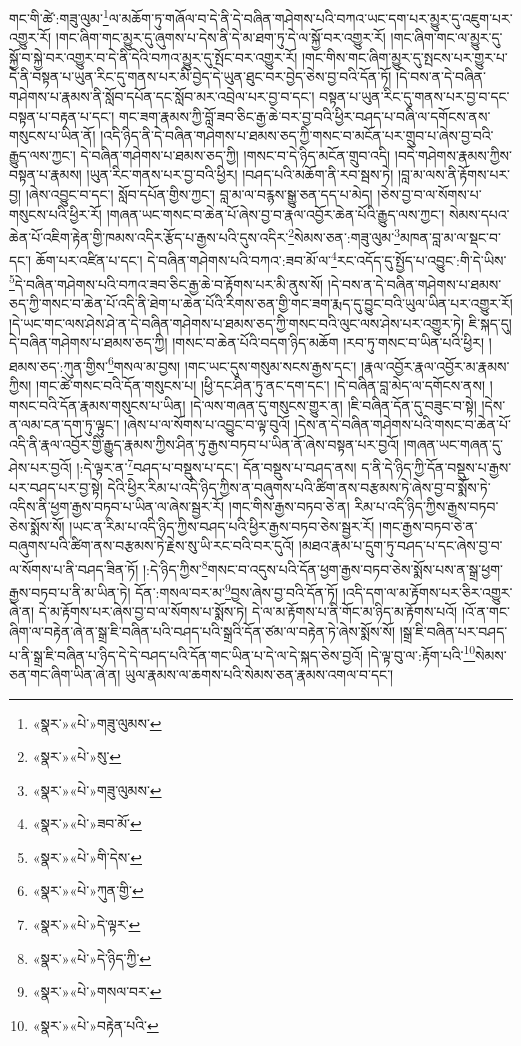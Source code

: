 གང་གི་ཚེ་:གཟུ་ལུམ་\footnote{«སྣར་»«པེ་»གཟུ་ལུམས་}ལ་མཆོག་ཏུ་གཞོལ་བ་དེ་ནི་དེ་བཞིན་གཤེགས་པའི་བཀའ་ཡང་དག་པར་མྱུར་དུ་འཇུག་པར་འགྱུར་རོ། །གང་ཞིག་གང་མྱུར་དུ་ཞུགས་པ་དེས་ནི་དེ་མ་ཐག་ཏུ་དེ་ལ་སྐྱོ་བར་འགྱུར་རོ། །གང་ཞིག་གང་ལ་མྱུར་དུ་སྐྱོ་བ་སྐྱེ་བར་འགྱུར་བ་དེ་ནི་དེའི་བཀའ་མྱུར་དུ་སྤོང་བར་འགྱུར་རོ། །གང་གིས་གང་ཞིག་མྱུར་དུ་སྤངས་པར་གྱུར་པ་དེ་ནི་བསྟན་པ་ཡུན་རིང་དུ་གནས་པར་མི་བྱེད་དེ་ཡུན་ཐུང་བར་བྱེད་ཅེས་བྱ་བའི་དོན་ཏོ། །དེ་བས་ན་དེ་བཞིན་གཤེགས་པ་རྣམས་ནི་སློབ་དཔོན་དང་སློབ་མར་འབྲེལ་པར་བྱ་བ་དང་། བསྟན་པ་ཡུན་རིང་དུ་གནས་པར་བྱ་བ་དང་བསྟན་པ་བརྟན་པ་དང་། གང་ཟག་རྣམས་ཀྱི་བློ་ཟབ་ཅིང་རྒྱ་ཆེ་བར་བྱ་བའི་ཕྱིར་བཤད་པ་བཞི་ལ་དགོངས་ནས་གསུངས་པ་ཡིན་ནོ། །འདི་ཉིད་ནི་དེ་བཞིན་གཤེགས་པ་ཐམས་ཅད་ཀྱི་གསང་བ་མངོན་པར་གྲུབ་པ་ཞེས་བྱ་བའི་རྒྱུད་ལས་ཀྱང་། དེ་བཞིན་གཤེགས་པ་ཐམས་ཅད་ཀྱི། །གསང་བ་དེ་ཉིད་མངོན་གྲུབ་འདི། །བདེ་གཤེགས་རྣམས་ཀྱིས་བསྟན་པ་རྣམས། །ཡུན་རིང་གནས་པར་བྱ་བའི་ཕྱིར། །བཤད་པའི་མཆོག་ནི་རབ་སྦས་ཏེ། །བླ་མ་ལས་ནི་རྟོགས་པར་བྱ། །ཞེས་འབྱུང་བ་དང་། སློབ་དཔོན་གྱིས་ཀྱང་། བླ་མ་ལ་བརྙས་སྒྱུ་ཅན་དད་པ་མེད། །ཅེས་བྱ་བ་ལ་སོགས་པ་གསུངས་པའི་ཕྱིར་རོ། །གཞན་ཡང་གསང་བ་ཆེན་པོ་ཞེས་བྱ་བ་རྣལ་འབྱོར་ཆེན་པོའི་རྒྱུད་ལས་ཀྱང་། སེམས་དཔའ་ཆེན་པོ་འཇིག་རྟེན་གྱི་ཁམས་འདིར་རྩོད་པ་རྒྱས་པའི་དུས་འདིར་\footnote{«སྣར་»«པེ་»སུ་}སེམས་ཅན་:གཟུ་ལུམ་\footnote{«སྣར་»«པེ་»གཟུ་ལུམས་}མཁན་བླ་མ་ལ་སྡང་བ་དང་། ཆོག་པར་འཛིན་པ་དང་། དེ་བཞིན་གཤེགས་པའི་བཀའ་:ཟབ་མོ་ལ་\footnote{«སྣར་»«པེ་»ཟབ་མོ་}རང་འདོད་དུ་སྤྱོད་པ་འབྱུང་:གི་དེ་ཡིས་\footnote{«སྣར་»«པེ་»གི་དེས་}དེ་བཞིན་གཤེགས་པའི་བཀའ་ཟབ་ཅིང་རྒྱ་ཆེ་བ་རྟོགས་པར་མི་ནུས་སོ། །དེ་བས་ན་དེ་བཞིན་གཤེགས་པ་ཐམས་ཅད་ཀྱི་གསང་བ་ཆེན་པོ་འདི་ནི་ཐེག་པ་ཆེན་པོའི་རིགས་ཅན་གྱི་གང་ཟག་རྨད་དུ་བྱུང་བའི་ཡུལ་ཡིན་པར་འགྱུར་རོ། །དེ་ཡང་གང་ལས་ཤེས་ཤེ་ན་དེ་བཞིན་གཤེགས་པ་ཐམས་ཅད་ཀྱི་གསང་བའི་ལུང་ལས་ཤེས་པར་འགྱུར་ཏེ། ཇི་སྐད་དུ། དེ་བཞིན་གཤེགས་པ་ཐམས་ཅད་ཀྱི། །གསང་བ་ཆེན་པོའི་བདག་ཉིད་མཆོག །རབ་ཏུ་གསང་བ་ཡིན་པའི་ཕྱིར། །ཐམས་ཅད་:ཀུན་གྱིས་\footnote{«སྣར་»«པེ་»ཀུན་གྱི་}གསལ་མ་བྱས། །གང་ཡང་དུས་གསུམ་སངས་རྒྱས་དང་། །རྣལ་འབྱོར་རྣལ་འབྱོར་མ་རྣམས་ཀྱིས། །གང་ཚེ་གསང་བའི་དོན་གསུངས་པ། །ཕྱི་དང་ཤིན་ཏུ་ནང་དག་དང་། །དེ་བཞིན་བླ་མེད་ལ་དགོངས་ནས། །གསང་བའི་དོན་རྣམས་གསུངས་པ་ཡིན། །དེ་ལས་གཞན་དུ་གསུངས་གྱུར་ན། །ཇི་བཞིན་དོན་དུ་བཟུང་བ་སྟེ། །དེས་ན་ལམ་ངན་དག་ཏུ་ལྟུང་། །ཞེས་པ་ལ་སོགས་པ་འབྱུང་བ་ལྟ་བུའོ། །དེས་ན་དེ་བཞིན་གཤེགས་པའི་གསང་བ་ཆེན་པོ་འདི་ནི་རྣལ་འབྱོར་གྱི་རྒྱུད་རྣམས་ཀྱིས་ཤིན་ཏུ་རྒྱས་བཏབ་པ་ཡིན་ནོ་ཞེས་བསྟན་པར་བྱའོ། །གཞན་ཡང་གཞན་དུ་ཤེས་པར་བྱའོ། །:དེ་ལྟར་ན་\footnote{«སྣར་»«པེ་»དེ་ལྟར་}བཤད་པ་བསྡུས་པ་དང་། དོན་བསྡུས་པ་བཤད་ནས། ད་ནི་དེ་ཉིད་ཀྱི་དོན་བསྡུས་པ་རྒྱས་པར་བཤད་པར་བྱ་སྟེ། དེའི་ཕྱིར་རིམ་པ་འདི་ཉིད་ཀྱིས་ན་བཞུགས་པའི་ཚིག་ནས་བརྩམས་ཏེ་ཞེས་བྱ་བ་སྨོས་ཏེ་འདིས་ནི་ཕྱག་རྒྱས་བཏབ་པ་ཡིན་ལ་ཞེས་སྦྱར་རོ། །གང་གིས་རྒྱས་བཏབ་ཅེ་ན། རིམ་པ་འདི་ཉིད་ཀྱིས་རྒྱས་བཏབ་ཅེས་སྨོས་སོ། །ཡང་ན་རིམ་པ་འདི་ཉིད་ཀྱིས་བཤད་པའི་ཕྱིར་རྒྱས་བཏབ་ཅེས་སྦྱར་རོ། །གང་རྒྱས་བཏབ་ཅེ་ན་བཞུགས་པའི་ཚིག་ནས་བརྩམས་ཏེ་རྗེས་སུ་ཡི་རང་བའི་བར་དུའོ། །མཐའ་རྣམ་པ་དྲུག་ཏུ་བཤད་པ་དང་ཞེས་བྱ་བ་ལ་སོགས་པ་ནི་བཤད་ཟིན་ཏོ། །:དེ་ཉིད་ཀྱིས་\footnote{«སྣར་»«པེ་»དེ་ཉིད་ཀྱི་}གསང་བ་འདུས་པའི་དོན་ཕྱག་རྒྱས་བཏབ་ཅེས་སྨོས་པས་ན་སྒྲ་ཕྱག་རྒྱས་བཏབ་པ་ནི་མ་ཡིན་ཏེ། དོན་:གསལ་བར་མ་\footnote{«སྣར་»«པེ་»གསལ་བར་}བྱས་ཞེས་བྱ་བའི་དོན་ཏོ། །འདི་དག་ལ་མ་རྟོགས་པར་ཅིར་འགྱུར་ཞེ་ན། དེ་མ་རྟོགས་པར་ཞེས་བྱ་བ་ལ་སོགས་པ་སྨོས་ཏེ། དེ་ལ་མ་རྟོགས་པ་ནི་གོང་མ་ཉིད་མ་རྟོགས་པའོ། །འོ་ན་གང་ཞིག་ལ་བརྟེན་ཞེ་ན་སྒྲ་ཇི་བཞིན་པའི་བཤད་པའི་སྒྲའི་དོན་ཙམ་ལ་བརྟེན་ཏེ་ཞེས་སྨོས་སོ། །སྒྲ་ཇི་བཞིན་པར་བཤད་པ་ནི་སྒྲ་ཇི་བཞིན་པ་ཉིད་དེ་དེ་བཤད་པའི་དོན་གང་ཡིན་པ་དེ་ལ་དེ་སྐད་ཅེས་བྱའོ། །དེ་ལྟ་བུ་ལ་:རྟོག་པའི་\footnote{«སྣར་»«པེ་»བརྟེན་པའི་}སེམས་ཅན་གང་ཞིག་ཡིན་ཞེ་ན། ཡུལ་རྣམས་ལ་ཆགས་པའི་སེམས་ཅན་རྣམས་འགལ་བ་དང་། 